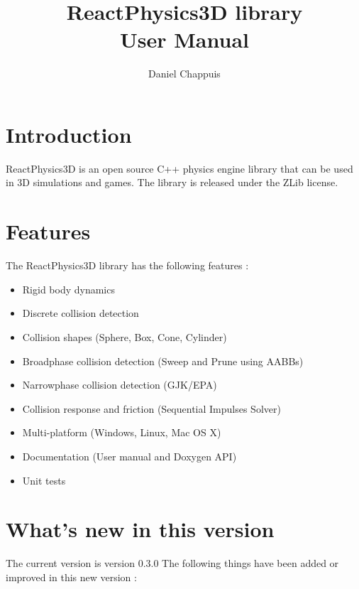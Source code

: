 \documentclass[a4paper,12pt]{article}
\begin{document}
   \author{Daniel Chappuis}
   \title{ReactPhysics3D library \\ User Manual}
   \maketitle

   \tableofcontents

   \newpage
 

   \section{Introduction}

  ReactPhysics3D is an open source C++ physics engine library that can be used
  in 3D simulations and games. The library is released under the ZLib license.

   \section{Features}

   The ReactPhysics3D library has the following features :

   \begin{itemize}
    \item Rigid body dynamics 
    \item Discrete collision detection 
    \item Collision shapes (Sphere, Box, Cone, Cylinder) 
    \item Broadphase collision detection (Sweep and Prune using AABBs) 
    \item Narrowphase collision detection (GJK/EPA) 
    \item Collision response and friction (Sequential Impulses Solver)
    \item Multi-platform (Windows, Linux, Mac OS X)
    \item Documentation (User manual and Doxygen API)
    \item Unit tests
   \end{itemize}

  \section{What's new in this version}

  The current version is version 0.3.0 The following things have been
  added or improved in this new version : \\
   
\end{document}
